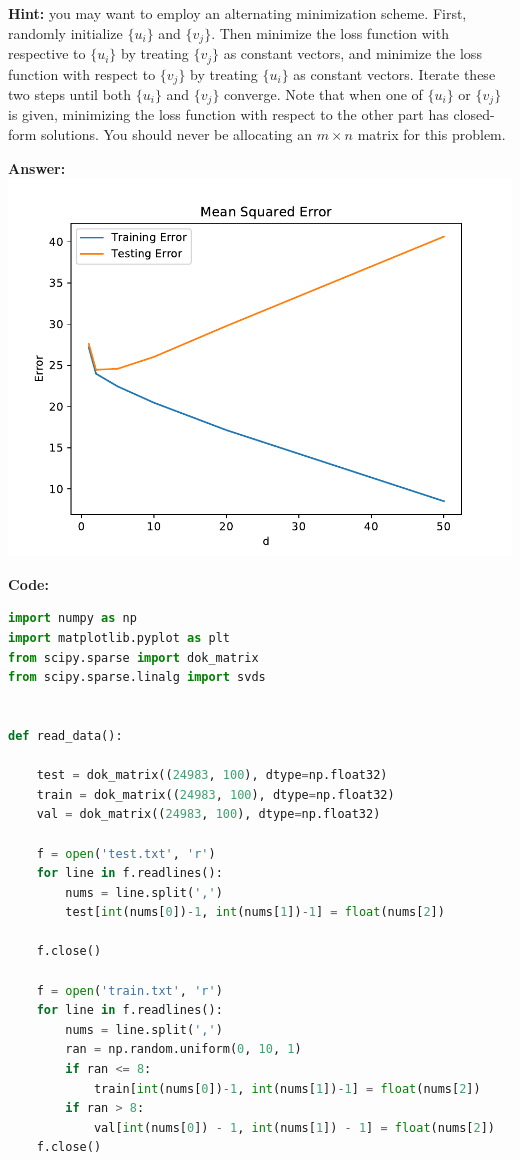 \documentclass{article}
\newcommand{\1}{\mathbf{1}}
\begin{document}
\begin{enumerate}
{\bf Hint:} you may want to employ an alternating minimization scheme. First, randomly initialize $\{u_i\}$ and $\{v_j\}$. Then minimize the loss function with respective to $\{u_i\}$ by treating $\{v_j\}$ as constant vectors, and minimize the loss function with respect to $\{v_j\}$ by treating $\{u_i\}$ as constant vectors. Iterate these two steps until both $\{u_i\}$ and $\{v_j\}$ converge. Note that when one of $\{u_i\}$ or $\{v_j\}$ is given, minimizing the loss function with respect to the other part has closed-form solutions. You should never be allocating an $m \times n$ matrix for this problem. 

\textbf{Answer:}\\
\includegraphics[width=4 in]{Figures/loss_err_mse.pdf}  

\textbf{Code:}
\begin{lstlisting}[language=Python]
import numpy as np
import matplotlib.pyplot as plt
from scipy.sparse import dok_matrix
from scipy.sparse.linalg import svds


def read_data():

    test = dok_matrix((24983, 100), dtype=np.float32)
    train = dok_matrix((24983, 100), dtype=np.float32)
    val = dok_matrix((24983, 100), dtype=np.float32)

    f = open('test.txt', 'r')
    for line in f.readlines():
        nums = line.split(',')
        test[int(nums[0])-1, int(nums[1])-1] = float(nums[2])

    f.close()

    f = open('train.txt', 'r')
    for line in f.readlines():
        nums = line.split(',')
        ran = np.random.uniform(0, 10, 1)
        if ran <= 8:
            train[int(nums[0])-1, int(nums[1])-1] = float(nums[2])
        if ran > 8:
            val[int(nums[0]) - 1, int(nums[1]) - 1] = float(nums[2])
    f.close()


\end{lstlisting}
\end{enumerate}
\end{document}

